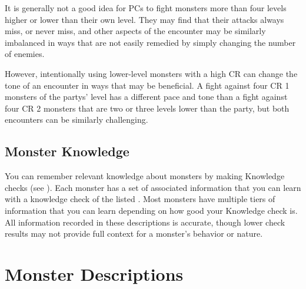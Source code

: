         It is generally not a good idea for PCs to fight monsters more than four levels higher or lower than their own level.
        They may find that their attacks always miss, or never miss, and other aspects of the encounter may be similarly imbalanced in ways that are not easily remedied by simply changing the number of enemies.

        However, intentionally using lower-level monsters with a high CR can change the tone of an encounter in ways that may be beneficial.
        A fight against four CR 1 monsters of the partys' level has a different pace and tone than a fight against four CR 2 monsters that are two or three levels lower than the party, but both encounters can be similarly challenging.

    \subsection{Monster Knowledge}
        You can remember relevant knowledge about monsters by making Knowledge checks (see ).
        Each monster has a set of associated information that you can learn with a knowledge check of the listed .
        Most monsters have multiple tiers of information that you can learn depending on how good your Knowledge check is.
        All information recorded in these descriptions is accurate, though lower check results may not provide full context for a monster's behavior or nature.

\section{Monster Descriptions}


